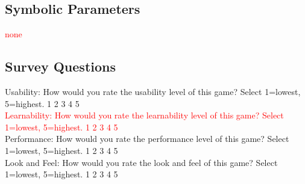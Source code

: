 \documentclass[12pt, titlepage]{article}
\begin{document}
\subsection{Symbolic Parameters}
\textcolor{red}{none}

\subsection{Survey Questions}

Usability: How would you rate the usability level of this game? Select 1=lowest, 5=highest. 1  2  3  4  5 \\

\textcolor{red}{Learnability: How would you rate the learnability level of this game? Select 1=lowest, 5=highest. 1  2  3  4  5} \\

Performance: How would you rate the performance level of this game? Select 1=lowest, 5=highest. 1  2  3  4  5 \\

Look and Feel: How would you rate the look and feel of this game? Select 1=lowest, 5=highest. 1  2  3  4  5 \\
\end{document}
